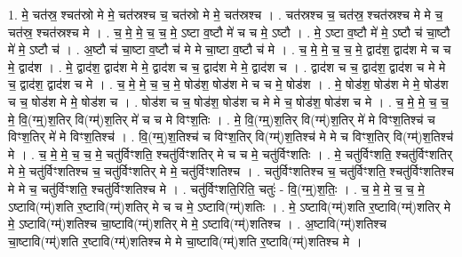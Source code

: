 \documentclass[17pt]{extarticle}
\begin{document}
1. मे॒ चत॑स्र॒ श्चत॑स्रो मे मे॒ चत॑स्रश्च च॒ चत॑स्रो मे मे॒ चत॑स्रश्च । . चत॑स्रश्च च॒ चत॑स्र॒ श्चत॑स्रश्च मे मे च॒ चत॑स्र॒ श्चत॑स्रश्च मे । . च॒ मे॒ मे॒ च॒ च॒ मे॒ ऽष्टा व॒ष्टौ मे॑ च च मे॒ ऽष्टौ । . मे॒ ऽष्टा व॒ष्टौ मे॑ मे॒ ऽष्टौ च॑ चा॒ष्टौ मे॑ मे॒ ऽष्टौ च॑ । . अ॒ष्टौ च॑ चा॒ष्टा व॒ष्टौ च॑ मे मे चा॒ष्टा व॒ष्टौ च॑ मे । . च॒ मे॒ मे॒ च॒ च॒ मे॒ द्वाद॑श॒ द्वाद॑श मे च च मे॒ द्वाद॑श । . मे॒ द्वाद॑श॒ द्वाद॑श मे मे॒ द्वाद॑श च च॒ द्वाद॑श मे मे॒ द्वाद॑श च । . द्वाद॑श च च॒ द्वाद॑श॒ द्वाद॑श च मे मे च॒ द्वाद॑श॒ द्वाद॑श च मे । . च॒ मे॒ मे॒ च॒ च॒ मे॒ षोड॑श॒ षोड॑श मे च च मे॒ षोड॑श । . मे॒ षोड॑श॒ षोड॑श मे मे॒ षोड॑श च च॒ षोड॑श मे मे॒ षोड॑श च । . षोड॑श च च॒ षोड॑श॒ षोड॑श च मे मे च॒ षोड॑श॒ षोड॑श च मे । . च॒ मे॒ मे॒ च॒ च॒ मे॒ वि॒(ग्म्॒)श॒तिर् वि(ग्म्॑)श॒तिर् मे॑ च च मे विꣳश॒तिः । . मे॒ वि॒(ग्म्॒)श॒तिर् वि(ग्म्॑)श॒तिर् मे॑ मे विꣳश॒तिश्च॑ च विꣳश॒तिर् मे॑ मे विꣳश॒तिश्च॑ । . वि॒(ग्म्॒)श॒तिश्च॑ च विꣳश॒तिर् वि(ग्म्॑)श॒तिश्च॑ मे मे च विꣳश॒तिर् वि(ग्म्॑)श॒तिश्च॑ मे । . च॒ मे॒ मे॒ च॒ च॒ मे॒ चतु॑र्विꣳशति॒ श्चतु॑र्विꣳशतिर् मे च च मे॒ चतु॑र्विꣳशतिः । . मे॒ चतु॑र्विꣳशति॒ श्चतु॑र्विꣳशतिर् मे मे॒ चतु॑र्विꣳशतिश्च च॒ चतु॑र्विꣳशतिर् मे मे॒ चतु॑र्विꣳशतिश्च । . चतु॑र्विꣳशतिश्च च॒ चतु॑र्विꣳशति॒ श्चतु॑र्विꣳशतिश्च मे मे च॒ चतु॑र्विꣳशति॒ श्चतु॑र्विꣳशतिश्च मे । . चतु॑र्विꣳशति॒रिति॒ चतुः॑ - वि॒(ग्म्॒)श॒तिः॒ । . च॒ मे॒ मे॒ च॒ च॒ मे॒ ऽष्टावि(ग्म्॑)शति र॒ष्टावि(ग्म्॑)शतिर् मे च च मे॒ ऽष्टावि(ग्म्॑)शतिः । . मे॒ ऽष्टावि(ग्म्॑)शति र॒ष्टावि(ग्म्॑)शतिर् मे मे॒ ऽष्टावि(ग्म्॑)शतिश्च चा॒ष्टावि(ग्म्॑)शतिर् मे मे॒ ऽष्टावि(ग्म्॑)शतिश्च । . अ॒ष्टावि(ग्म्॑)शतिश्च चा॒ष्टावि(ग्म्॑)शति र॒ष्टावि(ग्म्॑)शतिश्च मे मे चा॒ष्टावि(ग्म्॑)शति र॒ष्टावि(ग्म्॑)शतिश्च मे । \newline
\end{document}
